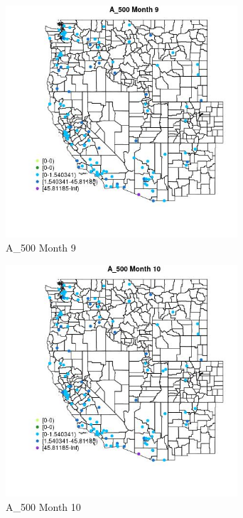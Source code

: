 \begin{figure} 
\centering  
\includegraphics[width=0.77\textwidth]{Code_Outputs/Report_ML_input_PM25_Step4_part_e_de_duplicated_aves_MapObsMo9A_500.jpg} 
\caption{\label{fig:Report_ML_input_PM25_Step4_part_e_de_duplicated_avesMapObsMo9A_500}A_500 Month 9} 
\end{figure} 
 

\begin{figure} 
\centering  
\includegraphics[width=0.77\textwidth]{Code_Outputs/Report_ML_input_PM25_Step4_part_e_de_duplicated_aves_MapObsMo10A_500.jpg} 
\caption{\label{fig:Report_ML_input_PM25_Step4_part_e_de_duplicated_avesMapObsMo10A_500}A_500 Month 10} 
\end{figure} 
 

